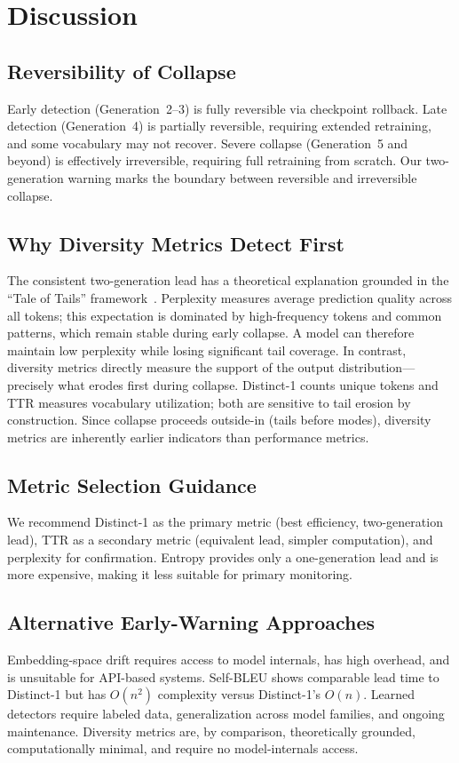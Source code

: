 \documentclass{svproc}
\newcommand{\dist}[1]{Distinct-#1}
\begin{document}
\section{Discussion}\label{sec:discussion}

\subsection{Reversibility of Collapse}
Early detection (Generation~2--3) is fully reversible via checkpoint rollback. Late
detection (Generation~4) is partially reversible, requiring extended retraining,
and some vocabulary may not recover. Severe collapse (Generation~5 and beyond) is
effectively irreversible, requiring full retraining from scratch. Our
two-generation warning marks the boundary between reversible and irreversible
collapse.

\subsection{Why Diversity Metrics Detect First}
The consistent two-generation lead has a theoretical explanation grounded in the
``Tale of Tails'' framework~\cite{dohmatob2024tale}. Perplexity measures average
prediction quality across all tokens; this expectation is dominated by
high-frequency tokens and common patterns, which remain stable during early
collapse. A model can therefore maintain low perplexity while losing significant
tail coverage. In contrast, diversity metrics directly measure the support of the
output distribution---precisely what erodes first during collapse. \dist{1} counts
unique tokens and TTR measures vocabulary utilization; both are sensitive to tail
erosion by construction. Since collapse proceeds outside-in (tails before modes),
diversity metrics are inherently earlier indicators than performance metrics.

\subsection{Metric Selection Guidance}
We recommend \dist{1} as the primary metric (best efficiency, two-generation lead),
TTR as a secondary metric (equivalent lead, simpler computation), and perplexity
for confirmation. Entropy provides only a one-generation lead and is more expensive,
making it less suitable for primary monitoring.

\subsection{Alternative Early-Warning Approaches}
Embedding-space drift requires access to model internals, has high overhead, and is
unsuitable for API-based systems. Self-BLEU shows comparable lead time to \dist{1}
but has $O(n^2)$ complexity versus \dist{1}'s $O(n)$. Learned detectors require
labeled data, generalization across model families, and ongoing maintenance.
Diversity metrics are, by comparison, theoretically grounded, computationally
minimal, and require no model-internals access.
\end{document}

